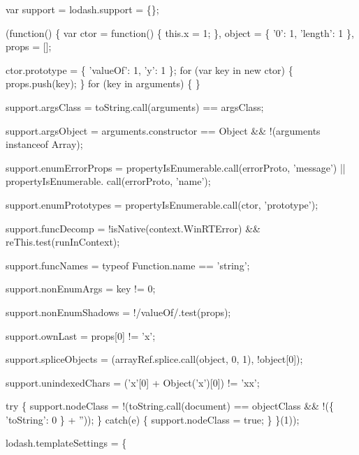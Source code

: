 \begin{DoxyCodeInclude}
    var support = lodash.support = \{\};

    (\textcolor{keyword}{function}() \{
      var ctor = \textcolor{keyword}{function}() \{ this.x = 1; \},
          \textcolor{keywordtype}{object} = \{ \textcolor{charliteral}{'0'}: 1, \textcolor{stringliteral}{'length'}: 1 \},
          props = [];

      ctor.prototype = \{ \textcolor{stringliteral}{'valueOf'}: 1, \textcolor{charliteral}{'y'}: 1 \};
      \textcolor{keywordflow}{for} (var key in \textcolor{keyword}{new} ctor) \{ props.push(key); \}
      \textcolor{keywordflow}{for} (key in arguments) \{ \}

      support.argsClass = toString.call(arguments) == argsClass;

      support.argsObject = arguments.constructor == Object && !(arguments instanceof Array);

      support.enumErrorProps = propertyIsEnumerable.call(errorProto, \textcolor{stringliteral}{'message'}) || propertyIsEnumerable.
      call(errorProto, \textcolor{stringliteral}{'name'});

      support.enumPrototypes = propertyIsEnumerable.call(ctor, \textcolor{stringliteral}{'prototype'});

      support.funcDecomp = !isNative(context.WinRTError) && reThis.test(runInContext);

      support.funcNames = typeof Function.name == \textcolor{stringliteral}{'string'};

      support.nonEnumArgs = key != 0;

      support.nonEnumShadows = !/valueOf/.test(props);

      support.ownLast = props[0] != \textcolor{charliteral}{'x'};

      support.spliceObjects = (arrayRef.splice.call(\textcolor{keywordtype}{object}, 0, 1), !\textcolor{keywordtype}{object}[0]);

      support.unindexedChars = (\textcolor{charliteral}{'x'}[0] + Object(\textcolor{charliteral}{'x'})[0]) != \textcolor{stringliteral}{'xx'};

      \textcolor{keywordflow}{try} \{
        support.nodeClass = !(toString.call(document) == objectClass && !(\{ \textcolor{stringliteral}{'toString'}: 0 \} + \textcolor{stringliteral}{''}));
      \} \textcolor{keywordflow}{catch}(e) \{
        support.nodeClass = \textcolor{keyword}{true};
      \}
    \}(1));

    lodash.templateSettings = \{


\end{DoxyCodeInclude}
